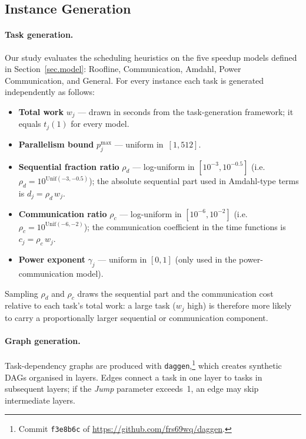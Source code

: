 \documentclass{article}
\begin{document}
\subsection{Instance Generation}
\label{sec:instance-gen2}
\paragraph{Task generation.}
Our study evaluates the scheduling heuristics on the five speedup models
defined in Section~\ref{sec.model}:
Roofline, Communication, Amdahl, Power Communication, and General.
For every instance each task is generated independently as follows:

\begin{itemize}
    \item \textbf{Total work} \(w_j\) — drawn in seconds from the
          task-generation framework; it equals \(t_j(1)\) for every model.
    \item \textbf{Parallelism bound} \(p_j^{\max}\) — uniform in $\,[1,512]$.
    \item \textbf{Sequential fraction ratio} $\rho_d$
          — log-uniform in $[10^{-3},10^{-0.5}]$
          (i.e.\ $\rho_d = 10^{\mathrm{Unif}(-3,-0.5)}$);  
          the absolute sequential part used in Amdahl-type terms is
          \(d_j = \rho_d \, w_j\).
    \item \textbf{Communication ratio} $\rho_c$
          — log-uniform in $[10^{-6},10^{-2}]$
          (i.e.\ $\rho_c = 10^{\mathrm{Unif}(-6,-2)}$);  
          the communication coefficient in the time functions is
          \(c_j = \rho_c \, w_j\).
    \item \textbf{Power exponent} $\gamma_j$ — uniform in $[0,1]$
          (only used in the power-communication model).
\end{itemize}

\noindent
Sampling $\rho_d$ and $\rho_c$ draws the
sequential part and the communication cost relative to each task’s
total work: a large task ($w_j$ high) is therefore more likely to carry a
proportionally larger sequential or communication component.



\paragraph{Graph generation.}
Task-dependency graphs are produced with \texttt{daggen},\footnote{Commit
\texttt{f3e8b6c} of
\url{https://github.com/frs69wq/daggen}.}
which creates synthetic DAGs organised in layers.
Edges connect a task in one layer to tasks in subsequent layers; if the
\textit{Jump} parameter exceeds~1, an edge may skip intermediate layers.
\end{document}
